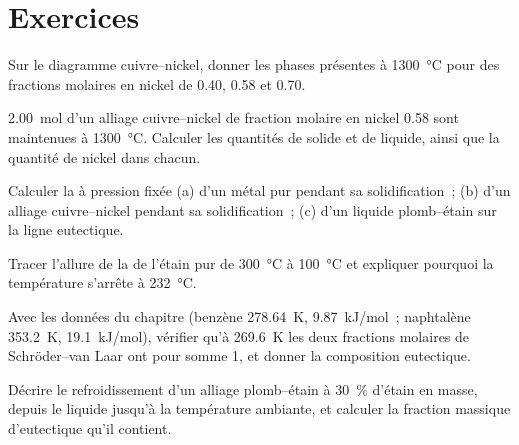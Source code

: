 \section{Exercices}

\begin{exercise}[$\star$]\label{exo:b2:solid-liquid-diagrams:1}
Sur le diagramme cuivre--nickel, donner les phases présentes à
\qty{1300}{\degreeCelsius} pour des fractions molaires en nickel de 0.40, 0.58 et 0.70.
\end{exercise}

\begin{exercise}[$\star$]\label{exo:b2:solid-liquid-diagrams:2}
\qty{2.00}{mol} d'un alliage cuivre--nickel de fraction molaire en nickel 0.58 sont maintenues
à \qty{1300}{\degreeCelsius}. Calculer les quantités de solide et de liquide, ainsi que la
quantité de nickel dans chacun.
\end{exercise}

\begin{exercise}[$\star$]\label{exo:b2:solid-liquid-diagrams:3}
Calculer la  à pression fixée (a) d'un métal pur pendant sa solidification~;
(b) d'un alliage cuivre--nickel pendant sa solidification~; (c) d'un liquide plomb--étain sur la
ligne eutectique.
\end{exercise}

\begin{exercise}[$\star$]\label{exo:b2:solid-liquid-diagrams:4}
Tracer l'allure de la  de l'étain pur de \qty{300}{\degreeCelsius} à
\qty{100}{\degreeCelsius} et expliquer pourquoi la température s'arrête à
\qty{232}{\degreeCelsius}.
\end{exercise}

\begin{exercise}[$\star\star$]\label{exo:b2:solid-liquid-diagrams:5}
Avec les données du chapitre (benzène \qty{278.64}{K}, \qty{9.87}{kJ/mol}~;
naphtalène \qty{353.2}{K}, \qty{19.1}{kJ/mol}), vérifier qu'à
\qty{269.6}{K} les deux fractions molaires de Schröder--van Laar ont pour somme 1, et donner
la composition eutectique.
\end{exercise}

\begin{exercise}[$\star\star$]\label{exo:b2:solid-liquid-diagrams:6}
Décrire le refroidissement d'un alliage plomb--étain à 30~\% d'étain en masse, depuis le liquide
jusqu'à la température ambiante, et calculer la fraction massique d'eutectique qu'il contient.
\end{exercise}

